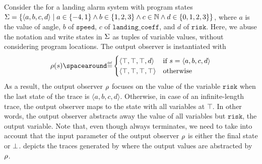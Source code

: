 \begin{example}
  Consider the  for a landing alarm system with program states $\Sigma=\{\langle a, b, c, d \rangle \mid a\in\{-4,1\}\land b\in\{1,2,3\}\land c\in\mathbb{N} \land d\in\{0,1,2,3\}\}$, where $a$ is the value of $\text{angle}$, $b$ of $\texttt{speed}$, $c$ of $\texttt{landing\_coeff}$, and $d$ of $\texttt{risk}$.
  Here, we abuse the notation and write states in $\Sigma$ as tuples of variable values, without considering program locations.
  The output observer is instantiated with
  \[
  \outputobs(\defstate) \DefeQ \begin{cases}
    \langle \top, \top, \top, d \rangle & \text{if } \defstate = \langle a, b, c, d \rangle \\
    \langle \top, \top, \top, \top \rangle & \text{otherwise}
  \end{cases}
  \]
  As a result, the output observer $\rho$ focuses on the value of the variable $\texttt{risk}$ when the last state of the trace is $\langle a, b, c, d \rangle$. Otherwise, in case of an infinite-length trace, the output observer maps to the state with all variables at $\top$.
  In other words, the output observer abstracts away the value of all variables but $\texttt{risk}$, the output variable.
  Note that, even though  always terminates, we need to take into account that the input parameter of the output observer $\rho$ is either the final state or $\bot$.
   depicts the traces generated by  where the output values are abstracted by $\rho$.
\end{example}
